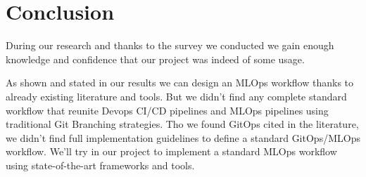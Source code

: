 \section{Conclusion}\label{sec:stconclusion}

During our research and thanks to the survey we conducted we gain enough knowledge and confidence that our project was indeed of some usage.

As shown and stated in our results we can design an MLOps workflow thanks to already existing literature and tools.
But we didn't find any complete standard workflow that reunite Devops CI/CD pipelines and MLOps pipelines using traditional Git Branching strategies.
Tho we found GitOps cited in the literature, we didn't find full implementation guidelines to define a standard GitOps/MLOps workflow.
We'll try in our project to implement a standard MLOps workflow using state-of-the-art frameworks and tools.